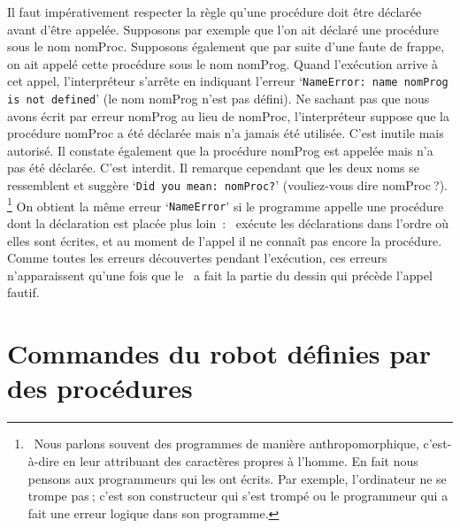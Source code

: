 Il faut impérativement respecter la règle qu'une procédure doit 
être
dé\-cla\-rée avant d'être ap\-pe\-lée. Supposons par exemple que l'on ait
déclaré une pro\-cé\-du\-re sous le nom {\idt nomProc}. Supposons également
que par suite d'une faute de frappe, on ait appelé cette procédure
sous le nom {\idt nomProg}. Quand l'exécution arrive à cet appel, l'interpréteur 
s'arrête en indiquant l'erreur
`{\tt NameError: name \textquotesingle{}nomProg\textquotesingle{} is not defined}' (le nom {\idt nomProg} n'est pas défini). 
Ne sachant pas que 
nous avons écrit par erreur {\idt nomProg} au lieu de {\idt nomProc}, l'interpréteur 
suppose que la procédure {\idt nomProc} a été déclarée mais n'a jamais été utilisée.
C'est inutile mais autorisé. Il constate également que la procédure
{\idt nomProg} est appelée mais n'a pas été déclarée. C'est interdit.
Il remarque cependant que les deux noms se ressemblent et suggère
`{\tt Did you mean: \textquotesingle{}nomProc\textquotesingle{}?}' (vouliez-vous dire {\idt nomProc}$\:$?).%
\footnote{\ Nous parlons souvent des programmes de manière 
anthropomorphique, c'est-à-dire en leur attribuant des caractères 
propres à l'homme. En fait nous pensons aux programmeurs qui les
ont écrits. Par exemple, l'ordinateur ne se trompe pas$\:$; c'est son 
constructeur qui s'est trompé ou le programmeur qui a fait une erreur 
logique dans son programme.} 
On obtient la même erreur `{\tt NameError}' si le programme appelle une procédure
dont la déclaration est placée plus loin~: \python\ exécute les déclarations dans 
l'ordre où elles sont écrites, et au moment de l'appel il ne connaît pas encore la procédure. 
Comme toutes les erreurs découvertes pendant l'exécution, ces erreurs n'apparaissent 
qu'une fois que le \robot\ a fait la partie du dessin qui précède l'appel fautif.

\section{Commandes du robot définies par des procédures} 

